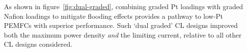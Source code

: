 \documentclass[final,3p,times,onecolumn]{elsarticle}    %
\begin{document}
As shown in figure~\ref{fig:dual-graded}, combining graded Pt loadings with graded Nafion loadings to mitigate flooding effects provides a pathway to low-Pt PEMFCs with superior performance. Such `dual graded' CL designs improved both the maximum power density \emph{and} the limiting current, relative to all other CL designs considered. 



\end{document}
